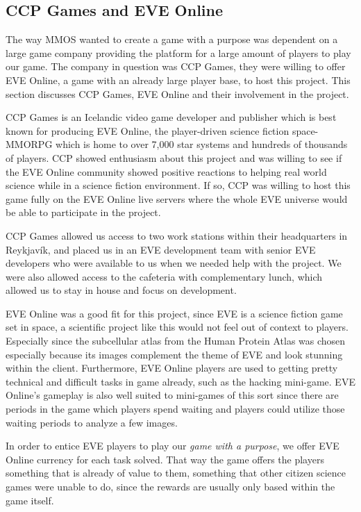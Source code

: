 
\subsection{CCP Games and EVE Online}
	The way MMOS wanted to create a game with a purpose was dependent on a large game company providing the platform for a large amount of players to play our game. The company in question was CCP Games, they were willing to offer EVE Online, a game with an already large player base, to host this project. This section discusses CCP Games, EVE Online and their involvement in the project.

	CCP Games is an Icelandic video game developer and publisher which is best known for producing EVE Online, the player-driven science fiction space-MMORPG which is home to over 7,000 star systems and hundreds of thousands of players. CCP showed enthusiasm about this project and was willing to see if the EVE Online community showed positive reactions to helping real world science while in a science fiction environment. If so, CCP was willing to host this game fully on the EVE Online live servers where the whole EVE universe would be able to participate in the project.

	CCP Games allowed us access to two work stations within their headquarters in Reykjavík, and placed us in an EVE development team with senior EVE developers who were available to us when we needed help with the project. We were also allowed access to the cafeteria with complementary lunch, which allowed us to stay in house and focus on development.

	EVE Online was a good fit for this project, since EVE is a science fiction game set in space, a scientific project like this would not feel out of context to players. Especially since the subcellular atlas from the Human Protein Atlas was chosen especially because its images complement the theme of EVE and look stunning within the client. Furthermore, EVE Online players are used to getting pretty technical and difficult tasks in game already, such as the hacking mini-game. EVE Online's gameplay is also well suited to mini-games of this sort since there are periods in the game which players spend waiting and players could utilize those waiting periods to analyze a few images.

	In order to entice EVE players to play our \emph{game with a purpose}, we offer EVE Online currency for each task solved. That way the game offers the players something that is already of value to them, something that other citizen science games were unable to do, since the rewards are usually only based within the game itself.

